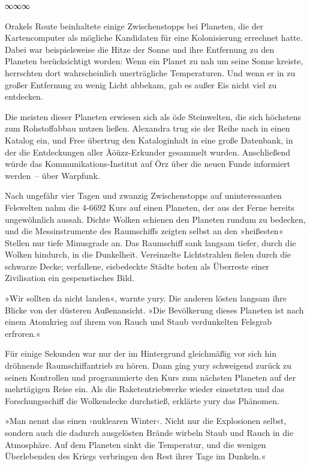 \begin{center}
    ∞∞∞
\end{center}

Orakels Route beinhaltete einige Zwischenstopps bei Planeten, die der Kartencomputer als mögliche Kandidaten für eine Kolonisierung errechnet hatte. Dabei war beispielsweise die Hitze der Sonne und ihre Entfernung zu den Planeten berücksichtigt worden: Wenn ein Planet zu nah um seine Sonne kreiste, herrschten dort wahrscheinlich unerträgliche Temperaturen. Und wenn er in zu großer Entfernung zu wenig Licht abbekam, gab es außer Eis nicht viel zu entdecken.

Die meisten dieser Planeten erwiesen sich als öde Steinwelten, die sich höchstens zum Rohstoffabbau nutzen ließen. Alexandra trug sie der Reihe nach in einen Katalog ein, und Free übertrug den Kataloginhalt in eine große Datenbank, in der die Entdeckungen aller Äöüzz-Erkunder gesammelt wurden. Anschließend würde das Kommunikations-Institut auf Örz über die neuen Funde informiert werden~– über Warpfunk.

Nach ungefähr vier Tagen und zwanzig Zwischenstopps auf uninteressanten Felswelten nahm die 4-6692 Kurs auf einen Planeten, der aus der Ferne bereits ungewöhnlich aussah. Dichte Wolken schienen den Planeten rundum zu bedecken, und die Messinstrumente des Raumschiffs zeigten selbst an den »heißesten« Stellen nur tiefe Minusgrade an. Das Raumschiff sank langsam tiefer, durch die Wolken hindurch, in die Dunkelheit. Vereinzelte Lichtstrahlen fielen durch die schwarze Decke; verfallene, eisbedeckte Städte boten als Überreste einer Zivilisation ein gespenstisches Bild.

»Wir sollten da nicht landen«, warnte yury. Die anderen lösten langsam ihre Blicke von der düsteren Außenansicht. »Die Bevölkerung dieses Planeten ist nach einem Atomkrieg auf ihrem von Rauch und Staub verdunkelten Felsgrab erfroren.«

Für einige Sekunden war nur der im Hintergrund gleichmäßig vor sich hin dröhnende Raumschiffantrieb zu hören. Dann ging yury schweigend zurück zu seinen Kontrollen und programmierte den Kurs zum nächsten Planeten auf der mehrtägigen Reise ein. Als die Raketentriebwerke wieder einsetzten und das Forschungsschiff die Wolkendecke durchstieß, erklärte yury das Phänomen.

»Man nennt das einen ›nuklearen Winter‹. Nicht nur die Explosionen selbst, sondern auch die dadurch ausgelösten Brände wirbeln Staub und Rauch in die Atmosphäre. Auf dem Planeten sinkt die Temperatur, und die wenigen Überlebenden des Kriegs verbringen den Rest ihrer Tage im Dunkeln.«

